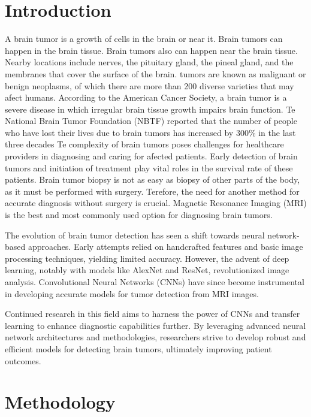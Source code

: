\documentclass[12pt]{article}
\begin{document}
	\section{Introduction}
	
A brain tumor is a growth of cells in the brain or near it. Brain tumors can happen in the brain tissue. Brain tumors also can happen near the brain tissue. Nearby locations include nerves, the pituitary gland, the pineal gland, and the membranes that cover the surface of the brain.
tumors are known as malignant or benign neoplasms, of which there are more than 200 diverse varieties that may afect humans. According to the American Cancer Society, a brain tumor is a
severe disease in which irregular brain tissue growth
impairs brain function. Te National Brain Tumor Foundation (NBTF) reported that the number of people who have lost their lives due to brain tumors has increased
by 300\% in the last three decades  Te complexity of brain
tumors poses challenges for healthcare providers in diagnosing and caring for afected patients. Early detection of brain tumors and initiation of treatment play vital roles in the survival rate of these patients. Brain tumor biopsy is not as easy as biopsy of other parts of the body, as it must be performed with surgery. Terefore, the need for another method for accurate diagnosis without surgery is crucial. Magnetic Resonance Imaging (MRI) is the best and most commonly used option for diagnosing brain tumors.

The evolution of brain tumor detection has seen a shift towards neural network-based approaches. Early attempts relied on handcrafted features and basic image processing techniques, yielding limited accuracy. However, the advent of deep learning, notably with models like AlexNet and ResNet, revolutionized image analysis. Convolutional Neural Networks (CNNs) have since become instrumental in developing accurate models for tumor detection from MRI images.

Continued research in this field aims to harness the power of CNNs and transfer learning to enhance diagnostic capabilities further. By leveraging advanced neural network architectures and methodologies, researchers strive to develop robust and efficient models for detecting brain tumors, ultimately improving patient outcomes.
	


	\section{Methodology}
	
\end{document}
